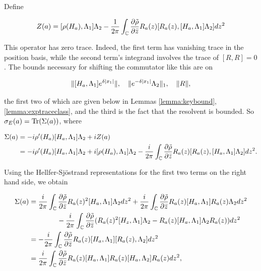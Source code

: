 \documentclass[12pt, letterpaper]{article}
\begin{document}


Define 

\[ Z(a) = [\rho(H_a),\Lambda_1]\Lambda_2 - \frac{1}{2\pi}\int_{\mathbb{C}} \frac{\partial \tilde{\rho}}{\partial \bar{z}} R_a(z)[R_a(z),[H_a,\Lambda_1]\Lambda_2] dz^2 \]

This operator has zero trace. Indeed, the first term has vanishing trace in the position basis, while the second term's integrand involves the trace of $[R,R]=0$. The bounds necessary for shifting the commutator like this are on 

\[\lVert [H_a,\Lambda_1]e^{\delta |x_1|} \rVert, \quad \lVert e^{-\delta |x_1|}\Lambda_2 \rVert_1, \quad \lVert R \rVert,\]


the first two of which are given below in Lemmas \ref{lemma:keybound}, \ref{lemma:exptraceclass}, and the third is the fact that the resolvent is bounded. So $\sigma_E(a) = \text{Tr}(\Sigma(a))$, where

\[\begin{aligned}
\Sigma(a) &=  -i\rho'(H_a)[H_a,\Lambda_1]\Lambda_2 + iZ(a)\\
&= -i\rho'(H_a)[H_a,\Lambda_1]\Lambda_2 + i[\rho(H_a),\Lambda_1]\Lambda_2 - \frac{i}{2\pi}\int_{\mathbb{C}}\frac{\partial \tilde{\rho}}{\partial \bar{z}} R_a(z)[R_a(z),[H_a,\Lambda_1]\Lambda_2] dz^2.
\end{aligned}\]

Using the Hellfer-Sj\"{o}strand representations for the first two terms on the right hand side, we obtain

\[\begin{aligned}
\Sigma(a) &= \frac{i}{2\pi}\int_{\mathbb{C}} \frac{\partial \tilde{\rho}}{\partial\bar{z}} R_a(z)^2[H_a,\Lambda_1]\Lambda_2 dz^2 + \frac{i}{2\pi}\int_{\mathbb{C}}\frac{\partial \tilde{\rho}}{\partial\bar{z}} R_a(z)[H_a,\Lambda_1]R_a(z)\Lambda_2dz^2 \\
&\quad\quad\quad\quad - \frac{i}{2\pi}\int_{\mathbb{C}} \frac{\partial \tilde{\rho}}{\partial\bar{z}} (R_a(z)^2[H_z,\Lambda_1]\Lambda_2 - R_a(z)[H_a,\Lambda_1]\Lambda_2 R_a(z)) dz^2\\
&= -\frac{i}{2\pi}\int_{\mathbb{C}}\frac{\partial \tilde{\rho}}{\partial\bar{z}} R_a(z)[H_a,\Lambda_1][R_a(z),\Lambda_2]dz^2\\
&= \frac{i}{2\pi}\int_{\mathbb{C}} \frac{\partial \tilde{\rho}}{\partial \bar{z}} R_a(z)[H_a,\Lambda_1]R_a(z)[H_a,\Lambda_2]R_a(z) dz^2,
\end{aligned}\]
\end{document}
